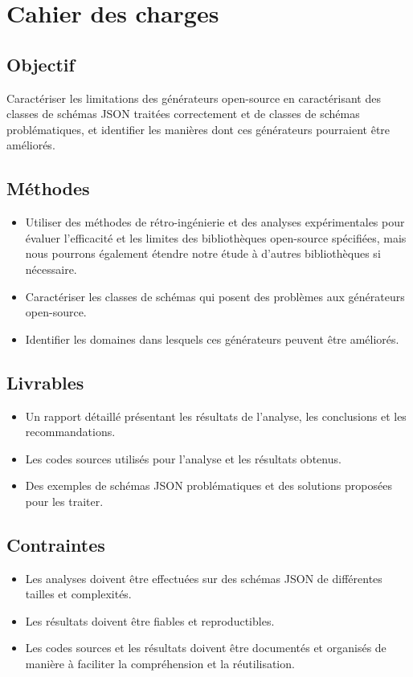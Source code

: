 \documentclass{article}
\begin{document}
\section{Cahier des charges}
\subsection{Objectif}
Caractériser les limitations des générateurs open-source en caractérisant des classes de schémas JSON traitées correctement et de classes de schémas problématiques, et identifier les manières dont ces générateurs pourraient être améliorés.
\subsection{Méthodes}
\begin{itemize}
\item Utiliser des méthodes de rétro-ingénierie et des analyses expérimentales pour évaluer l’efficacité et les limites des bibliothèques open-source spécifiées, mais nous pourrons également étendre notre étude à d’autres bibliothèques si nécessaire.\\
\item Caractériser les classes de schémas qui posent des problèmes aux générateurs open-source.\\
\item Identifier les domaines dans lesquels ces générateurs peuvent être améliorés.
\end{itemize}

\subsection{Livrables}
\begin{itemize}
\item Un rapport détaillé présentant les résultats de l'analyse, les conclusions et les recommandations. \\
\item Les codes sources utilisés pour l'analyse et les résultats obtenus.\\
\item Des exemples de schémas JSON problématiques et des solutions proposées pour les traiter.
\end{itemize}
\subsection{Contraintes}
\begin{itemize}
\item Les analyses doivent être effectuées sur des schémas JSON de différentes tailles et complexités.\\
\item Les résultats doivent être fiables et reproductibles.\\
\item Les codes sources et les résultats doivent être documentés et organisés de manière à faciliter la compréhension et la réutilisation.
\end{itemize}
\end{document}
